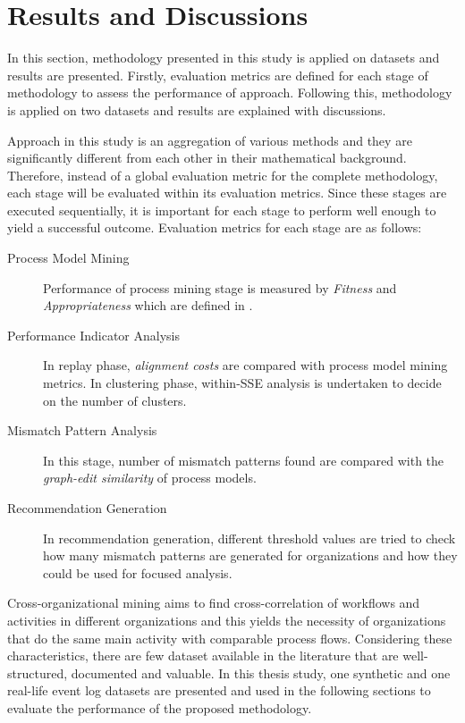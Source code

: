\section{Results and Discussions}
\label{sec:results-and-discussions}

In this section, methodology presented in this study is applied on datasets and results are presented. Firstly, evaluation metrics are defined for each stage of methodology to assess the performance of approach. Following this, methodology is applied on two datasets and results are explained with discussions.

Approach in this study is an aggregation of various methods and they are significantly different from each other in their mathematical background. Therefore, instead of a global evaluation metric for the complete methodology, each stage will be evaluated within its evaluation metrics. Since these stages are executed sequentially, it is important for each stage to perform well enough to yield a successful outcome. Evaluation metrics for each stage are as follows:

\begin{description}
	\item[Process Model Mining] Performance of process mining stage is measured by \textit{Fitness} and \textit{Appropriateness} which are defined in \cite{rozinat2008conformance}.
	\item[Performance Indicator Analysis] In replay phase, \textit{alignment costs} \cite{van2012replaying}  are compared with process model mining metrics. In clustering phase, within-SSE analysis is undertaken to decide on the number of clusters.
	\item[Mismatch Pattern Analysis] In this stage, number of mismatch patterns found are compared with the \textit{graph-edit similarity} \cite{dijkman2011similarity} of process models.
	\item[Recommendation Generation] In recommendation generation, different threshold values are tried to check how many mismatch patterns are generated for organizations and how they could be used for focused analysis.
\end{description}

Cross-organizational mining aims to find cross-correlation of workflows and activities in different organizations and this yields the necessity of organizations that do the same main activity with comparable process flows. Considering these characteristics, there are few dataset available in the literature that are well-structured, documented and valuable. In this thesis study, one synthetic and one real-life event log datasets are presented and used in the following sections to evaluate the performance of the proposed methodology.

